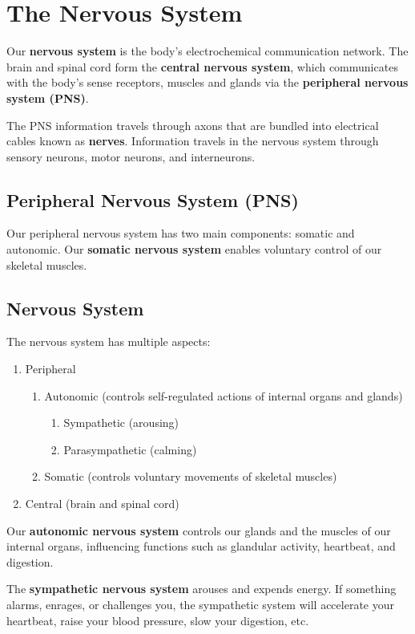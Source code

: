 \documentclass[12pt]{article}
\begin{document}
\section*{The Nervous System}
Our \textbf{nervous system} is the body's electrochemical communication network. The brain and spinal cord form the \textbf{central nervous system}, which communicates with the body's sense receptors, muscles and glands via the \textbf{peripheral nervous system (PNS)}.

The PNS information travels through axons that are bundled into electrical cables known as \textbf{nerves}. Information travels in the nervous system through sensory neurons, motor neurons, and interneurons.

\subsection*{Peripheral Nervous System (PNS)}
Our peripheral nervous system has two main components: somatic and autonomic. Our \textbf{somatic nervous system} enables voluntary control of our skeletal muscles.

\subsection*{Nervous System}
The nervous system has multiple aspects:
\begin{enumerate}
\item Peripheral
  \begin{enumerate}
  \item Autonomic (controls self-regulated actions of internal organs and glands)
    \begin{enumerate}
    \item Sympathetic (arousing)
    \item Parasympathetic (calming)
    \end{enumerate}
  \item Somatic (controls voluntary movements of skeletal muscles)
  \end{enumerate}
\item Central (brain and spinal cord)
\end{enumerate}

Our \textbf{autonomic nervous system} controls our glands and the muscles of our internal organs, influencing functions such as glandular activity, heartbeat, and digestion.

The \textbf{sympathetic nervous system} arouses and expends energy. If something alarms, enrages, or challenges you, the sympathetic system will accelerate your heartbeat, raise your blood pressure, slow your digestion, etc.
\end{document}
